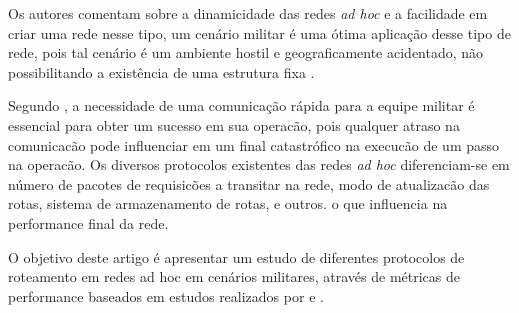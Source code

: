 Os autores \cite{pepe} comentam sobre a dinamicidade das redes \textit{ad hoc} e a facilidade em criar uma rede nesse tipo, um cen\'ario militar \'e uma \'otima aplica\c{c}\~ao desse tipo de rede, pois tal cen\'ario \'e um ambiente hostil e geograficamente acidentado, n\~ao possibilitando a exist\^encia de uma estrutura fixa \cite{schimidt}.

Segundo \cite{salles}, a necessidade de uma comunica\c{c}\~ao r\'apida para a equipe militar \'e essencial para obter um sucesso em sua operac\~ao, pois qualquer atraso na comunicac\~ao pode influenciar em um final catastr\'ofico na execuc\~ao de um passo na operac\~ao. 
Os diversos protocolos existentes das redes \textit{ad hoc} diferenciam-se em n\'umero de pacotes de requisic\~oes a transitar na rede, modo de atualizac\~ao das rotas, sistema de armazenamento de rotas, e outros. o que influencia na performance final da rede.

O objetivo deste artigo \'e apresentar um estudo de diferentes protocolos de roteamento em redes ad hoc em cen\'arios militares, atrav\'es de m\'etricas de performance baseados em estudos realizados por \cite{pereira} e \cite{salles}.
